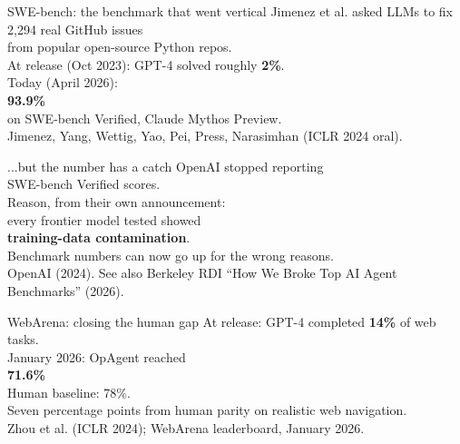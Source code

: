 \documentclass[aspectratio=169, 12pt, xcolor={dvipsnames,table}]{beamer}
\newcommand{\bignum}[1]{{\fontsize{60}{66}\selectfont\bfseries\color{accent}#1}}
\begin{document}
\begin{frame}{SWE-bench: the benchmark that went vertical}
  \vfill
  \centering
  {\Large Jimenez et al. asked LLMs to fix 2{,}294 real GitHub issues}\\[0.3em]
  {\Large from popular open-source Python repos.}\\[1em]
  {\large At release (Oct 2023): GPT-4 solved roughly \textbf{2\%}.}\\[0.6em]
  {\large Today (April 2026):}\\[0.2em]
  \bignum{93.9\%}\\[0.2em]
  {\large on SWE-bench Verified, Claude Mythos Preview.}\\[0.6em]
  {\scriptsize\color{mute}Jimenez, Yang, Wettig, Yao, Pei, Press, Narasimhan (ICLR 2024 oral).}
  \vfill
\end{frame}

\begin{frame}{...but the number has a catch}
  \vfill
  \centering
  {\Large OpenAI {\color{accent}stopped reporting}}\\[0.3em]
  {\Large SWE-bench Verified scores.}\\[1.5em]
  {\large Reason, from their own announcement:}\\[0.6em]
  {\large every frontier model tested showed}\\[0.3em]
  {\large \textbf{\color{accent}training-data contamination}.}\\[1.2em]
  {\color{mute}Benchmark numbers can now go up for the wrong reasons.}\\[1em]
  {\scriptsize\color{mute}OpenAI (2024). See also Berkeley RDI ``How We Broke Top AI Agent Benchmarks'' (2026).}
  \vfill
\end{frame}

\begin{frame}{WebArena: closing the human gap}
  \vfill
  \centering
  {\Large At release: GPT-4 completed \textbf{14\%} of web tasks.}\\[0.8em]
  {\Large January 2026: OpAgent reached}\\[0.2em]
  \bignum{71.6\%}\\[0.2em]
  {\Large Human baseline: {\color{accent}78\%}.}\\[1em]
  {\color{mute}Seven percentage points from human parity on realistic web navigation.}\\[0.6em]
  {\scriptsize\color{mute}Zhou et al. (ICLR 2024); WebArena leaderboard, January 2026.}
  \vfill
\end{frame}
\end{document}

